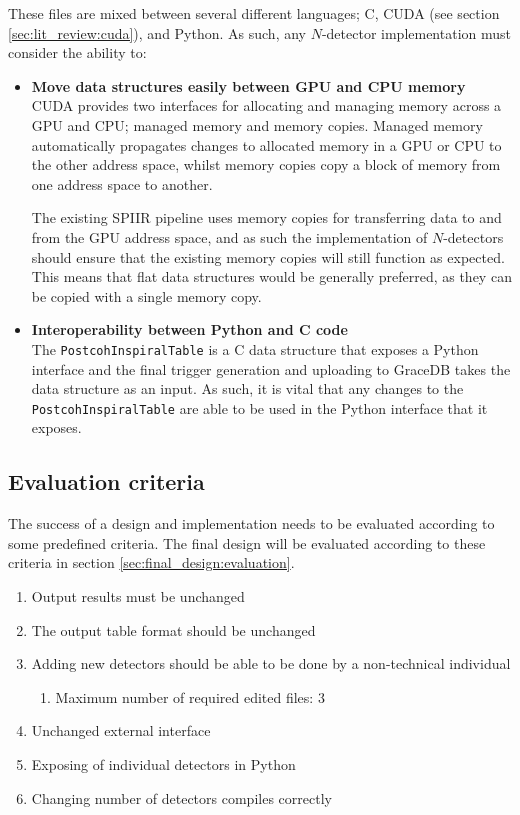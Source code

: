 \documentclass{article}
\begin{document}
These files are mixed between several different languages; C, CUDA (see section \ref{sec:lit_review:cuda}), and Python.
As such, any \(N\)-detector implementation must consider the ability to:
\begin{itemize}
    \item \textbf{Move data structures easily between GPU and CPU memory}\\
        CUDA provides two interfaces for allocating and managing memory across a GPU and CPU; managed memory and memory copies.
        Managed memory automatically propagates changes to allocated memory in a GPU or CPU to the other address space, whilst memory copies copy a block of memory from one address space to another.
 
        The existing SPIIR pipeline uses memory copies for transferring data to and from the GPU address space, and as such the implementation of \(N\)-detectors should ensure that the existing memory copies will still function as expected.
        This means that flat data structures would be generally preferred, as they can be copied with a single memory copy.

    \item \textbf{Interoperability between Python and C code}\\
        The \texttt{PostcohInspiralTable} is a C data structure that exposes a Python interface and the final trigger generation and uploading to GraceDB takes the data structure as an input.
        As such, it is vital that any changes to the \texttt{PostcohInspiralTable} are able to be used in the Python interface that it exposes.
\end{itemize}

\subsection{Evaluation criteria} \label{sec:design_process:criteria}

The success of a design and implementation needs to be evaluated according to some predefined criteria.
The final design will be evaluated according to these criteria in section \ref{sec:final_design:evaluation}.

\begin{enumerate}
    \item Output results must be unchanged
    \item The output table format should be unchanged
    \item Adding new detectors should be able to be done by a non-technical individual
        \begin{enumerate}
            \item Maximum number of required edited files: 3
        \end{enumerate}
    \item Unchanged external interface
    \item Exposing of individual detectors in Python
    \item Changing number of detectors compiles correctly
\end{enumerate}
\end{document}
